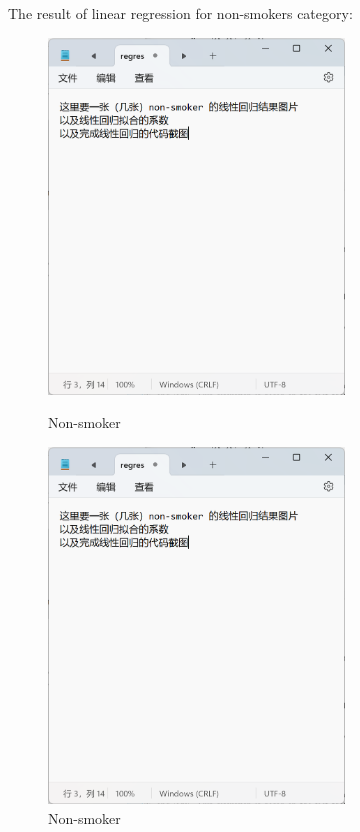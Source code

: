 \documentclass[12pt,a4paper]{article}
\begin{document}
The result of linear regression for non-smokers category:
\begin{figure}[H]
\begin{minipage}[t]{0.48\textwidth}
\centering
\includegraphics[width = 0.7\textwidth]{regression_non-smoker.png}
\caption{Non-smoker}
\end{minipage}
\begin{minipage}[t]{0.48\textwidth}
\centering
\includegraphics[width = 0.7\textwidth]{regression_non-smoker.png}
\caption{Non-smoker}
\end{minipage}
\end{figure}
\end{document}
